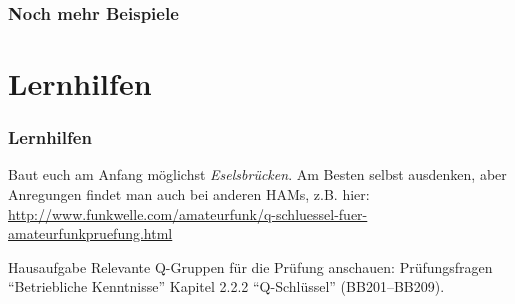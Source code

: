 \begin{frame}
  \frametitle{Noch mehr Beispiele}





\end{frame}

\section*{Lernhilfen}

\begin{frame}
  \frametitle{Lernhilfen}

  Baut euch am Anfang möglichst \emph{Eselsbrücken}. Am Besten selbst
  ausdenken, aber Anregungen findet man auch bei anderen HAMs, z.B. hier: \\[2em]

  \ExternalLink \url{http://www.funkwelle.com/amateurfunk/q-schluessel-fuer-amateurfunkpruefung.html}

\end{frame}

\begin{frame}
  \begin{alertblock}{Hausaufgabe}
    Relevante Q-Gruppen für die Prüfung anschauen: Prüfungsfragen ``Betriebliche Kenntnisse'' Kapitel 2.2.2 ``Q-Schlüssel'' (BB201--BB209).
  \end{alertblock}
\end{frame}

